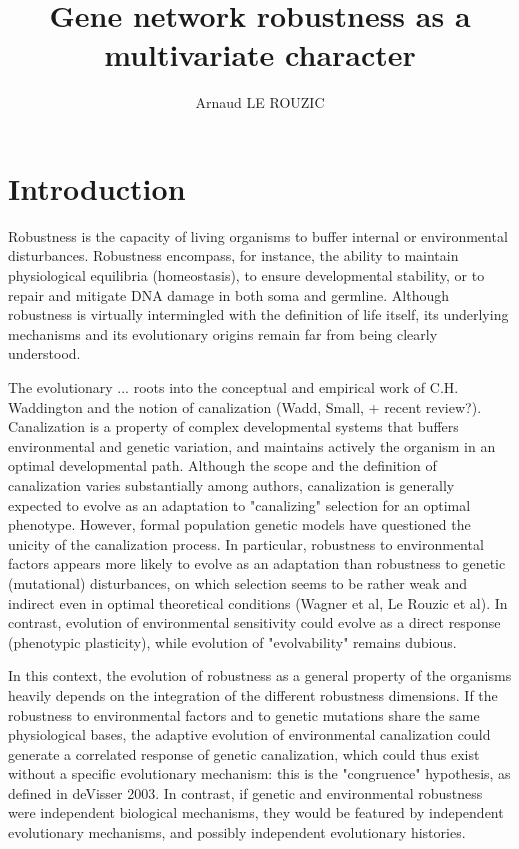 \documentclass[a4paper]{article}
\title{Gene network robustness as a multivariate character}
\author{Arnaud LE ROUZIC}
\date{}
\begin{document}
\maketitle

\section{Introduction}

Robustness is the capacity of living organisms to buffer internal or environmental disturbances. Robustness encompass, for instance, the ability to maintain physiological equilibria (homeostasis), to ensure developmental stability, or to repair and mitigate DNA damage in both soma and germline. Although robustness is virtually intermingled with the definition of life itself, its underlying mechanisms and its evolutionary origins remain far from being clearly understood. 

The evolutionary ... roots into the conceptual and empirical work of C.H. Waddington and the notion of canalization (Wadd, Small, + recent review?). Canalization is a property of complex developmental systems that buffers environmental and genetic variation, and maintains actively the organism in an optimal developmental path. Although the scope and the definition of canalization varies substantially among authors, canalization is generally expected to evolve as an adaptation to "canalizing" selection for an optimal phenotype. However, formal population genetic models have questioned the unicity of the canalization process. In particular, robustness to environmental factors appears more likely to evolve as an adaptation than robustness to genetic (mutational) disturbances, on which selection seems to be rather weak and indirect even in optimal theoretical conditions (Wagner et al, Le Rouzic et al). In contrast, evolution of environmental sensitivity could evolve as a direct response (phenotypic plasticity), while evolution of "evolvability" remains dubious. 

In this context, the evolution of robustness as a general property of the organisms heavily depends on the integration of the different robustness dimensions. If the robustness to environmental factors and to genetic mutations share the same physiological bases, the adaptive evolution of environmental canalization could generate a correlated response of genetic canalization, which could thus exist without a specific evolutionary mechanism: this is the "congruence" hypothesis, as defined in deVisser 2003. In contrast, if genetic and environmental robustness were independent biological mechanisms, they would be featured by independent evolutionary mechanisms, and possibly independent evolutionary histories. 
\end{document}
